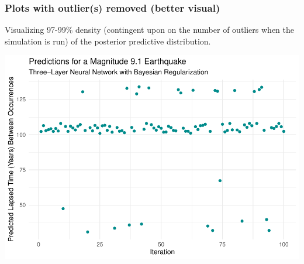 \hypertarget{plots-with-outliers-removed-better-visual}{%
\subsubsection{Plots with outlier(s) removed (better
visual)}\label{plots-with-outliers-removed-better-visual}}

Visualizing 97-99\% density (contingent upon on the number of outliers
when the simulation is run) of the posterior predictive distribution.

\begin{Shaded}
\begin{Highlighting}[]
\OtherTok{\textless{}{-}}\NormalTok{[}\SpecialCharTok{$}\SpecialCharTok{\textgreater{}} \SpecialCharTok{{-}}\NormalTok{),] }

\NormalTok{(} \SpecialCharTok{/}\SpecialCharTok{\^{}}\SpecialCharTok{+}
\NormalTok{(} \NormalTok{, } \NormalTok{, } \NormalTok{) }\SpecialCharTok{+} 
    \NormalTok{(} \NormalTok{,}
          \NormalTok{,}
          \NormalTok{,}
          \NormalTok{) }\SpecialCharTok{+}
  \NormalTok{()}
\end{Highlighting}
\end{Shaded}

\includegraphics{earthquakes_files/figure-latex/unnamed-chunk-14-1.pdf}

